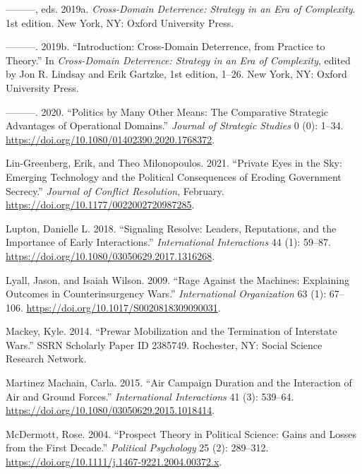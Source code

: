 \documentclass[
]{article}
\begin{document}
\leavevmode\hypertarget{ref-lindsay_crossdomaindeterrencestrategy_2019}{}%
---------, eds. 2019a. \emph{Cross-Domain Deterrence: Strategy in an Era of Complexity}. 1st edition. New York, NY: Oxford University Press.

\leavevmode\hypertarget{ref-lindsay_introductioncrossdomaindeterrence_2019}{}%
---------. 2019b. ``Introduction: Cross-Domain Deterrence, from Practice to Theory.'' In \emph{Cross-Domain Deterrence: Strategy in an Era of Complexity}, edited by Jon R. Lindsay and Erik Gartzke, 1st edition, 1--26. New York, NY: Oxford University Press.

\leavevmode\hypertarget{ref-lindsay_politicsmanyother_2020}{}%
---------. 2020. ``Politics by Many Other Means: The Comparative Strategic Advantages of Operational Domains.'' \emph{Journal of Strategic Studies} 0 (0): 1--34. \url{https://doi.org/10.1080/01402390.2020.1768372}.

\leavevmode\hypertarget{ref-lin-greenberg_privateeyessky_2021}{}%
Lin-Greenberg, Erik, and Theo Milonopoulos. 2021. ``Private Eyes in the Sky: Emerging Technology and the Political Consequences of Eroding Government Secrecy.'' \emph{Journal of Conflict Resolution}, February. \url{https://doi.org/10.1177/0022002720987285}.

\leavevmode\hypertarget{ref-lupton_signalingresolveleaders_2018}{}%
Lupton, Danielle L. 2018. ``Signaling Resolve: Leaders, Reputations, and the Importance of Early Interactions.'' \emph{International Interactions} 44 (1): 59--87. \url{https://doi.org/10.1080/03050629.2017.1316268}.

\leavevmode\hypertarget{ref-lyall_ragemachinesexplaining_2009}{}%
Lyall, Jason, and Isaiah Wilson. 2009. ``Rage Against the Machines: Explaining Outcomes in Counterinsurgency Wars.'' \emph{International Organization} 63 (1): 67--106. \url{https://doi.org/10.1017/S0020818309090031}.

\leavevmode\hypertarget{ref-mackey_prewarmobilizationtermination_2014}{}%
Mackey, Kyle. 2014. ``Prewar Mobilization and the Termination of Interstate Wars.'' SSRN Scholarly Paper ID 2385749. Rochester, NY: Social Science Research Network.

\leavevmode\hypertarget{ref-martinezmachain_aircampaignduration_2015}{}%
Martinez Machain, Carla. 2015. ``Air Campaign Duration and the Interaction of Air and Ground Forces.'' \emph{International Interactions} 41 (3): 539--64. \url{https://doi.org/10.1080/03050629.2015.1018414}.

\leavevmode\hypertarget{ref-mcdermott_prospecttheorypolitical_2004}{}%
McDermott, Rose. 2004. ``Prospect Theory in Political Science: Gains and Losses from the First Decade.'' \emph{Political Psychology} 25 (2): 289--312. \url{https://doi.org/10.1111/j.1467-9221.2004.00372.x}.
\end{document}
